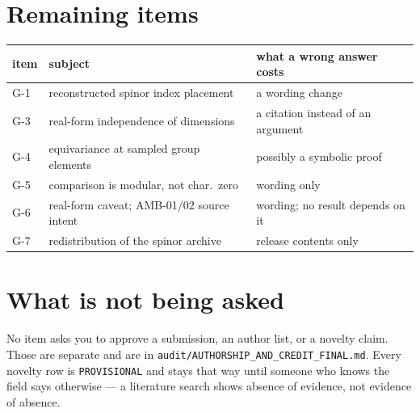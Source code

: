 \documentclass[11pt,a4paper]{article}
\begin{document}
\section*{Remaining items}

\begin{center}
\begin{tabular}{lll}
\toprule
item & subject & what a wrong answer costs \\
\midrule
G-1 & reconstructed spinor index placement & a wording change \\
G-3 & real-form independence of dimensions & a citation instead of an argument \\
G-4 & equivariance at sampled group elements & possibly a symbolic proof \\
G-5 & comparison is modular, not char.\ zero & wording only \\
G-6 & real-form caveat; AMB-01/02 source intent & wording; no result depends on it \\
G-7 & redistribution of the spinor archive & release contents only \\
\bottomrule
\end{tabular}
\end{center}

\section*{What is not being asked}

No item asks you to approve a submission, an author list, or a novelty claim.
Those are separate and are in \texttt{audit/AUTHORSHIP\_AND\_CREDIT\_FINAL.md}.
Every novelty row is \texttt{PROVISIONAL} and stays that way until someone who
knows the field says otherwise --- a literature search shows absence of evidence,
not evidence of absence.
\end{document}
